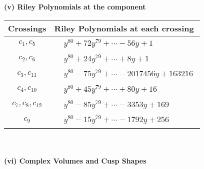 \documentclass[1p]{elsarticle_modified}
\theoremstyle{definition}
\begin{document}
\newpage\renewcommand{\arraystretch}{1}
\flushleft \textbf{(v) Riley Polynomials at the component}\newline \\
\begin{tabular}{m{50pt}|m{274pt}}
Crossings & \hspace{64pt}Riley Polynomials at each crossing \\
\hline $$\begin{aligned}c_{1},c_{5}\end{aligned}$$&$\begin{aligned}
&y^{80}+72 y^{79}+\cdots-56 y+1
\end{aligned}$\\
\hline $$\begin{aligned}c_{2},c_{6}\end{aligned}$$&$\begin{aligned}
&y^{80}+24 y^{79}+\cdots+8 y+1
\end{aligned}$\\
\hline $$\begin{aligned}c_{3},c_{11}\end{aligned}$$&$\begin{aligned}
&y^{80}-75 y^{79}+\cdots-2017456 y+163216
\end{aligned}$\\
\hline $$\begin{aligned}c_{4},c_{10}\end{aligned}$$&$\begin{aligned}
&y^{80}+45 y^{79}+\cdots+80 y+16
\end{aligned}$\\
\hline $$\begin{aligned}c_{7},c_{8},c_{12}\end{aligned}$$&$\begin{aligned}
&y^{80}-85 y^{79}+\cdots-3353 y+169
\end{aligned}$\\
\hline $$\begin{aligned}c_{9}\end{aligned}$$&$\begin{aligned}
&y^{80}-15 y^{79}+\cdots-1792 y+256
\end{aligned}$\\
\hline
\end{tabular}\\~\\
\newpage\flushleft \textbf{(vi) Complex Volumes and Cusp Shapes}
\end{document}
